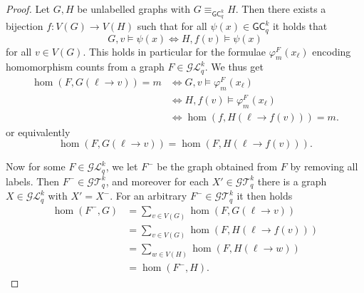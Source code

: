 \documentclass[a4paper,UKenglish,cleveref, autoref, thm-restate]{lipics-v2021}
\renewcommand{\phi}{\varphi}
\newcommand{\Ekq}{\ensuremath{\mathcal{T}_{q}^{k}}}
\newcommand{\Lkq}{\ensuremath{\mathcal{L}_{q}^{k}}}
\newcommand{\GEkq}{\ensuremath{\mathcal{G}\Lkq}}
\newcommand{\GEkqLL}{\ensuremath{\mathcal{G}\Ekq}}
\newcommand{\lGC}{\ensuremath{\mathsf{GC}}}
\begin{document}
  \begin{proof}
  Let $G, H$ be unlabelled graphs with $G \equiv_{\lGC^k_q} H$. Then there exists a bijection $f \colon V(G) \to V(H)$ such that for all $\psi(x) \in \lGC^k_q$ it holds that
  \begin{equation*}
    G, v \models \psi(x) \iff H, f(v) \models \psi(x)
  \end{equation*}
  for all $v \in V(G)$. This holds in particular for the formulae $\phi^F_m(x_\ell)$ encoding homomorphism counts from a graph $F \in \GEkq$. We thus get
  \begin{align*}
    \hom(F, G(\ell \to v)) = m &\iff G, v \models \phi^F_m(x_\ell)\\
                               &\iff H, f(v) \models \phi^F_m(x_\ell)\\
                               &\iff \hom(f, H(\ell \to f(v))) = m.
  \end{align*}
  or equivalently
  \begin{equation*}
    \hom(F, G(\ell \to v)) = \hom(F, H(\ell \to f(v))).
  \end{equation*}

  Now for some $F \in \GEkq$, we let $F^-$ be the graph obtained from $F$ by removing all labels. Then $F^- \in \GEkqLL$, and moreover for each $X' \in \GEkqLL$ there is a graph $X \in \GEkq$ with $X' = X^-$. For an arbitrary $F^- \in \GEkqLL$ it then holds
  \begin{align*}
    \hom(F^-, G) &= \sum_{v \in V(G)}\hom(F, G(\ell \to v))\\
                 &= \sum_{v \in V(G)} \hom(F, H(\ell \to f(v)))\\
                 &= \sum_{w \in V(H)} \hom(F, H(\ell \to w))\\
                 &= \hom(F^-, H).
  \end{align*}
\end{proof}
\end{document}
